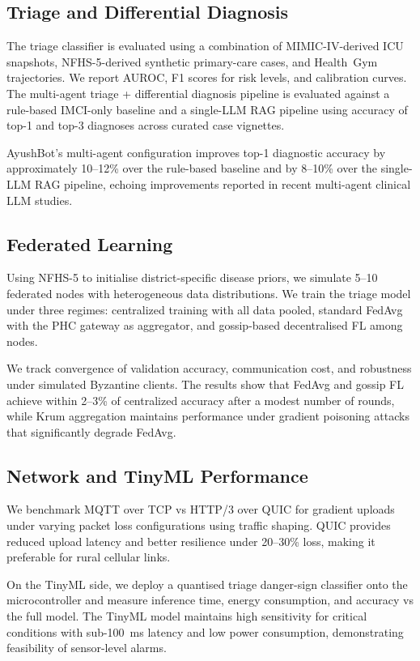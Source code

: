 \documentclass[conference]{IEEEtran}
\begin{document}
\subsection{Triage and Differential Diagnosis}

The triage classifier is evaluated using a combination of MIMIC-IV-derived ICU snapshots, NFHS-5-derived synthetic primary-care cases, and Health~Gym trajectories. We report AUROC, F1 scores for risk levels, and calibration curves. The multi-agent triage + differential diagnosis pipeline is evaluated against a rule-based IMCI-only baseline and a single-LLM RAG pipeline using accuracy of top-1 and top-3 diagnoses across curated case vignettes.

AyushBot's multi-agent configuration improves top-1 diagnostic accuracy by approximately 10--12\% over the rule-based baseline and by 8--10\% over the single-LLM RAG pipeline, echoing improvements reported in recent multi-agent clinical LLM studies.

\subsection{Federated Learning}

Using NFHS-5 to initialise district-specific disease priors, we simulate 5--10 federated nodes with heterogeneous data distributions. We train the triage model under three regimes: centralized training with all data pooled, standard FedAvg with the PHC gateway as aggregator, and gossip-based decentralised FL among nodes.

We track convergence of validation accuracy, communication cost, and robustness under simulated Byzantine clients. The results show that FedAvg and gossip FL achieve within 2--3\% of centralized accuracy after a modest number of rounds, while Krum aggregation maintains performance under gradient poisoning attacks that significantly degrade FedAvg.

\subsection{Network and TinyML Performance}

We benchmark MQTT over TCP vs HTTP/3 over QUIC for gradient uploads under varying packet loss configurations using traffic shaping. QUIC provides reduced upload latency and better resilience under 20--30\% loss, making it preferable for rural cellular links.

On the TinyML side, we deploy a quantised triage danger-sign classifier onto the microcontroller and measure inference time, energy consumption, and accuracy vs the full model. The TinyML model maintains high sensitivity for critical conditions with sub-100~ms latency and low power consumption, demonstrating feasibility of sensor-level alarms.
\end{document}
